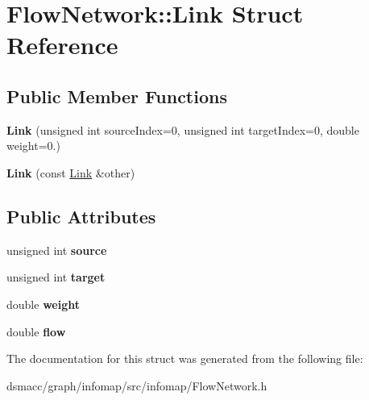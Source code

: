 \hypertarget{structFlowNetwork_1_1Link}{}\section{Flow\+Network\+:\+:Link Struct Reference}
\label{structFlowNetwork_1_1Link}
\subsection*{Public Member Functions}
\begin{DoxyCompactItemize}
\item 
\mbox{\label{structFlowNetwork_1_1Link_a1a2113f47fc4520a7a5b34d713eecddc}} 
{\bfseries Link} (unsigned int source\+Index=0, unsigned int target\+Index=0, double weight=0.)
\item 
\mbox{\label{structFlowNetwork_1_1Link_a52057b0f4b849be024f20354af40a2cf}} 
{\bfseries Link} (const \mbox{\hyperlink{structFlowNetwork_1_1Link}{Link}} \&other)
\end{DoxyCompactItemize}
\subsection*{Public Attributes}
\begin{DoxyCompactItemize}
\item 
\mbox{\label{structFlowNetwork_1_1Link_a6467fb91673517ee0ae3ec5572718656}} 
unsigned int {\bfseries source}
\item 
\mbox{\label{structFlowNetwork_1_1Link_a1c4be6042c49d97cf80041c37bc7301c}} 
unsigned int {\bfseries target}
\item 
\mbox{\label{structFlowNetwork_1_1Link_ac036145f60d2d4d13cdda7233b6c8c5b}} 
double {\bfseries weight}
\item 
\mbox{\label{structFlowNetwork_1_1Link_adb0627902f137096df283ca80789c7d4}} 
double {\bfseries flow}
\end{DoxyCompactItemize}


The documentation for this struct was generated from the following file\+:\begin{DoxyCompactItemize}
\item 
dsmacc/graph/infomap/src/infomap/Flow\+Network.\+h\end{DoxyCompactItemize}
